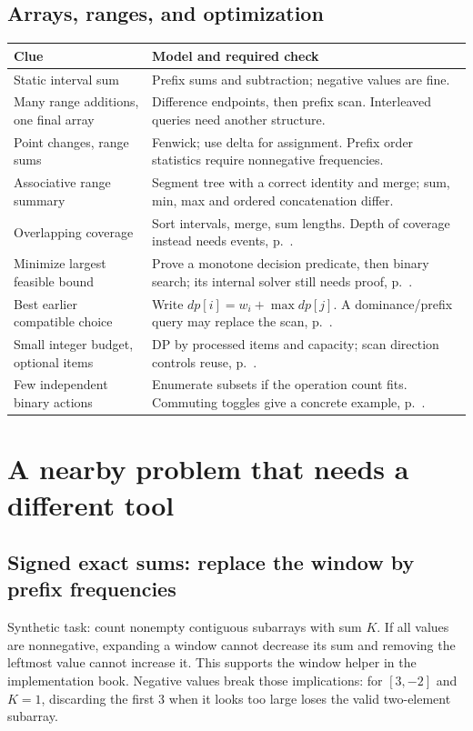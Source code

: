 \subsection{Arrays, ranges, and optimization}
\noindent\begin{tabular}{@{}p{}p{}@{}}
\textbf{Clue} & \textbf{Model and required check}\\\hline
Static interval sum & Prefix sums and subtraction; negative values are fine.\\
Many range additions, one final array & Difference endpoints, then prefix scan. Interleaved queries need another structure.\\
Point changes, range sums & Fenwick; use delta for assignment. Prefix order statistics require nonnegative frequencies.\\
Associative range summary & Segment tree with a correct identity and merge; sum, min, max and ordered concatenation differ.\\
Overlapping coverage & Sort intervals, merge, sum lengths. Depth of coverage instead needs events, p.~\pageref{case:intervals}.\\
Minimize largest feasible bound & Prove a monotone decision predicate, then binary search; its internal solver still needs proof, p.~\pageref{case:capacity}.\\
Best earlier compatible choice & Write $dp[i]=w_i+\max dp[j]$. A dominance/prefix query may replace the scan, p.~\pageref{case:fundraising}.\\
Small integer budget, optional items & DP by processed items and capacity; scan direction controls reuse, p.~\pageref{case:knapsack}.\\
Few independent binary actions & Enumerate subsets if the operation count fits. Commuting toggles give a concrete example, p.~\pageref{case:flip}.\\
\end{tabular}

\section{A nearby problem that needs a different tool}
\label{case:exact-sum}
\subsection{Signed exact sums: replace the window by prefix frequencies}
Synthetic task: count nonempty contiguous subarrays with sum $K$. If all
values are nonnegative, expanding a window cannot decrease its sum and
removing the leftmost value cannot increase it. This supports the window
helper in the implementation book. Negative values break those implications:
for $[3,-2]$ and $K=1$, discarding the first 3 when it looks too large loses
the valid two-element subarray.


